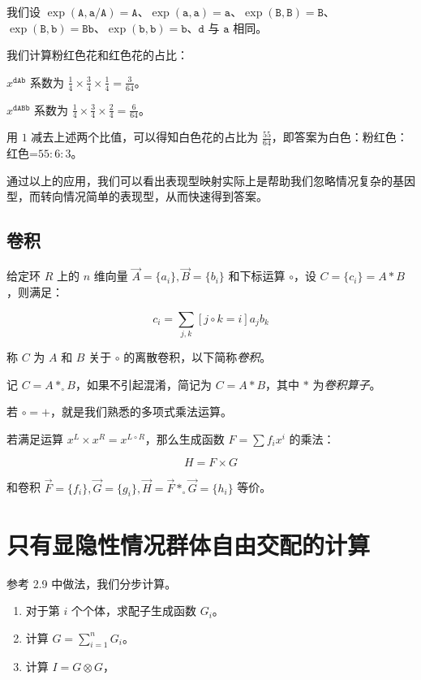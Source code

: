 \documentclass[12pt]{article} %
\begin{document}
我们设 $\operatorname{exp}(\texttt{A},\texttt{a}/\texttt{A})=\texttt{A}$、$\operatorname{exp}(\texttt{a},\texttt{a})=\texttt{a}$、$\operatorname{exp}(\texttt{B},\texttt{B})=\texttt{B}$、$\operatorname{exp}(\texttt{B},\texttt{b})=\texttt{Bb}$、$\operatorname{exp}(\texttt{b},\texttt{b})=\texttt{b}$、$\texttt{d}$ 与 $\texttt{a}$ 相同。

我们计算粉红色花和红色花的占比：

$x^{\texttt{dAb}}$ 系数为 $\frac{1}{4} \times \frac{3}{4} \times \frac{1}{4}=\frac{3}{64}$。

$x^{\texttt{dABb}}$ 系数为 $\frac{1}{4} \times \frac{3}{4} \times \frac{2}{4}=\frac{6}{64}$。

用 $1$ 减去上述两个比值，可以得知白色花的占比为 $\frac{55}{64}$，即答案为白色：粉红色：红色=$55:6:3$。

通过以上的应用，我们可以看出表现型映射实际上是帮助我们忽略情况复杂的基因型，而转向情况简单的表现型，从而快速得到答案。

\subsection{卷积}

给定环 $R$ 上的 $n$ 维向量 $\vec A=\{a_i\},\vec B=\{b_i\}$ 和下标运算 $\circ$，设 $C=\{c_i\}=A*B$，则满足：

\begin{equation*}
    c_i=\sum_{j,k} [j \circ k=i] a_jb_k
\end{equation*}

称 $C$ 为 $A$ 和 $B$ 关于 $\circ$ 的离散卷积，以下简称\textsl{卷积}。

记 $C=A*_{\circ}B$，如果不引起混淆，简记为 $C=A*B$，其中 $*$ 为\textsl{卷积算子}。

若 $\circ = +$，就是我们熟悉的多项式乘法运算。

若满足运算 $x^L \times x^R = x^{L \circ R}$，那么生成函数 $F=\sum f_i x^i$ 的乘法：

$$H=F \times G$$

和卷积 $\vec F=\{f_i\},\vec G=\{g_i\},\vec H=\vec F *_{\circ} \vec G=\{h_i\}$ 等价。

\newpage

\section{只有显隐性情况群体自由交配的计算}

参考 2.9 中做法，我们分步计算。

\begin{enumerate}
    \item 对于第 $i$ 个个体，求配子生成函数 $G_i$。
    \item 计算 $G=\sum_{i=1}^n G_i$。 
    \item 计算 $I=G \otimes G$，
\end{enumerate}
\end{document}
